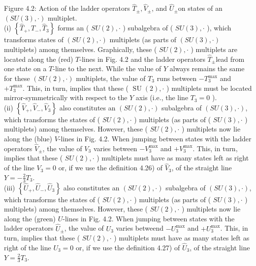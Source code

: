 \documentclass[10pt, letterpaper]{article}
\begin{document}
Figure 4.2: Action of the ladder operators $\hat{T}_{ \pm}, \hat{V}_{ \pm}$, and $\hat{U}_{ \pm}$on states of an $(S U(3), \cdot)$ multiplet.\\
(i) $\left\{\hat{T}_{+}, \hat{T}_{-}, \hat{T}_{3}\right\}$ forms an ( $S U(2), \cdot$ ) subalgebra of ( $S U(3), \cdot$ ), which transforms states of $(S U(2), \cdot)$ multiplets (as parts of $(S U(3), \cdot)$ multiplets) among themselves. Graphically, these ( $S U(2), \cdot$ ) multiplets are located along the (red) $T$-lines in Fig. 4.2 and the ladder operators $\hat{T}_{ \pm}$lead from one state on a $T$-line to the next. While the value of $Y$ always remains the same for these $(S U(2), \cdot)$ multiplets, the value of $T_{3}$ runs between $-T_{3}^{\max }$ and $+T_{3}^{\max }$. This, in turn, implies that these ( $\operatorname{SU}(2), \cdot$ ) multiplets must be located mirror-symmetrically with respect to the $Y$ axis (i.e., the line $T_{3}=0$ ).\\
(ii) $\left\{\hat{V}_{+}, \hat{V}_{-}, \hat{V}_{3}\right\}$ also constitutes an $(S U(2), \cdot)$ subalgebra of $(S U(3), \cdot)$, which transforms the states of ( $S U(2), \cdot$ ) multiplets (as parts of ( $S U(3), \cdot$ ) multiplets) among themselves. However, these ( $S U(2), \cdot$ ) multiplets now lie along the (blue) $V$-lines in Fig. 4.2. When jumping between states with the ladder operators $\hat{V}_{ \pm}$, the value of $V_{3}$ varies between $-V_{3}^{\max }$ and $+V_{3}^{\max }$. This, in turn, implies that these ( $S U(2), \cdot$ ) multiplets must have as many states left as right of the line $V_{3}=0$ or, if we use the definition 4.26) of $\hat{V}_{3}$, of the straight line $Y=-\frac{2}{3} T_{3}$.\\
(iii) $\left\{\hat{U}_{+}, \hat{U}_{-}, \hat{U}_{3}\right\}$ also constitutes an $(S U(2), \cdot)$ subalgebra of $(S U(3), \cdot)$, which transforms the states of ( $S U(2), \cdot$ ) multiplets (as parts of ( $S U(3), \cdot$ ) multiplets) among themselves. However, these ( $S U(2), \cdot$ ) multiplets now lie along the (green) $U$-lines in Fig. 4.2. When jumping between states with the ladder operators $\hat{U}_{ \pm}$, the value of $U_{3}$ varies betweend $-U_{3}^{\max }$ and $+U_{3}^{\max }$. This, in turn, implies that these ( $S U(2), \cdot$ ) multiplets must have as many states left as right of the line $U_{3}=0$ or, if we use the definition 4.27) of $\hat{U}_{3}$, of the straight line $Y=\frac{2}{3} T_{3}$.
\end{document}
